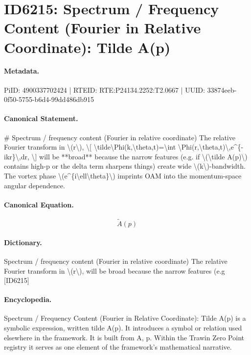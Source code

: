 \section*{ID6215: Spectrum / Frequency Content (Fourier in Relative Coordinate): Tilde A(p)}
\paragraph{Metadata.}
PiID: 4900337702424 | RTEID: RTE:P24134.2252:T2.0667 | UUID: 33874eeb-0f50-5755-b6d4-99dd486db915

\paragraph{Canonical Statement.}
\# Spectrum / frequency content (Fourier in relative coordinate) The relative Fourier transform in \textbackslash{}(r\textbackslash{}), \textbackslash{}[ \textbackslash{}tilde\textbackslash{}Phi(k,\textbackslash{}theta,t)=\textbackslash{}int \textbackslash{}Phi(r,\textbackslash{}theta,t)\textbackslash{},e\textasciicircum{}\{-ikr\}\textbackslash{},dr, \textbackslash{}] will be **broad** because the narrow features (e.g. if \textbackslash{}(\textbackslash{}tilde A(p)\textbackslash{}) contains high-p or the delta term sharpens things) create wide \textbackslash{}(k\textbackslash{})-bandwidth. The vortex phase \textbackslash{}(e\textasciicircum{}\{i\textbackslash{}ell\textbackslash{}theta\}\textbackslash{}) imprints OAM into the momentum-space angular dependence.

\paragraph{Canonical Equation.}
\[
\tilde A(p)
\]

\paragraph{Dictionary.}
Spectrum / frequency content (Fourier in relative coordinate) The relative Fourier transform in \textbackslash{}(r\textbackslash{}), will be broad because the narrow features (e.g [ID6215]

\paragraph{Encyclopedia.}
Spectrum / Frequency Content (Fourier in Relative Coordinate): Tilde A(p) is a symbolic expression, written tilde A(p). It introduces a symbol or relation used elsewhere in the framework. It is built from A, p. Within the Trawin Zero Point registry it serves as one element of the framework's mathematical narrative.
